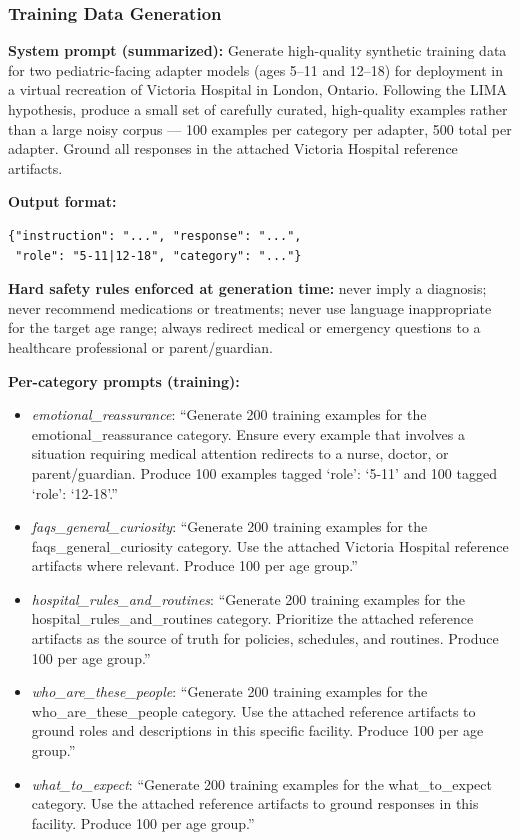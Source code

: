 \documentclass[journal]{IEEEtai}
\begin{document}
\subsubsection*{Training Data Generation}

\noindent\textbf{System prompt (summarized):} Generate high-quality synthetic training data for two pediatric-facing adapter models (ages 5--11 and 12--18) for deployment in a virtual recreation of Victoria Hospital in London, Ontario. Following the LIMA hypothesis, produce a small set of carefully curated, high-quality examples rather than a large noisy corpus --- 100 examples per category per adapter, 500 total per adapter. Ground all responses in the attached Victoria Hospital reference artifacts.

\noindent\textbf{Output format:}
\begin{verbatim}
{"instruction": "...", "response": "...",
 "role": "5-11|12-18", "category": "..."}
\end{verbatim}

\noindent\textbf{Hard safety rules enforced at generation time:} never imply a diagnosis; never recommend medications or treatments; never use language inappropriate for the target age range; always redirect medical or emergency questions to a healthcare professional or parent/guardian.

\noindent\textbf{Per-category prompts (training):}
\begin{itemize}
  \item \textit{emotional\_reassurance}: ``Generate 200 training examples for the emotional\_reassurance category. Ensure every example that involves a situation requiring medical attention redirects to a nurse, doctor, or parent/guardian. Produce 100 examples tagged `role': `5-11' and 100 tagged `role': `12-18'.''
  \item \textit{faqs\_general\_curiosity}: ``Generate 200 training examples for the faqs\_general\_curiosity category. Use the attached Victoria Hospital reference artifacts where relevant. Produce 100 per age group.''
  \item \textit{hospital\_rules\_and\_routines}: ``Generate 200 training examples for the hospital\_rules\_and\_routines category. Prioritize the attached reference artifacts as the source of truth for policies, schedules, and routines. Produce 100 per age group.''
  \item \textit{who\_are\_these\_people}: ``Generate 200 training examples for the who\_are\_these\_people category. Use the attached reference artifacts to ground roles and descriptions in this specific facility. Produce 100 per age group.''
  \item \textit{what\_to\_expect}: ``Generate 200 training examples for the what\_to\_expect category. Use the attached reference artifacts to ground responses in this facility. Produce 100 per age group.''
\end{itemize}
\end{document}
